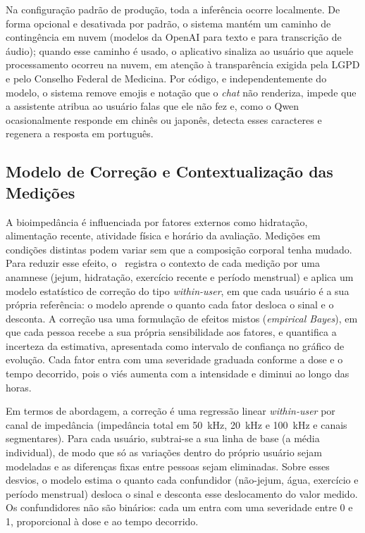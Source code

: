 Na configuração padrão de produção, toda a inferência ocorre localmente. De forma opcional e
desativada por padrão, o sistema mantém um caminho de contingência em nuvem (modelos da
OpenAI para texto e para transcrição de áudio); quando esse caminho é usado, o aplicativo
sinaliza ao usuário que aquele processamento ocorreu na nuvem, em atenção à transparência
exigida pela LGPD e pelo Conselho Federal de Medicina. Por código, e independentemente do
modelo, o sistema remove emojis e notação que o \emph{chat} não renderiza, impede que a
assistente atribua ao usuário falas que ele não fez e, como o Qwen ocasionalmente responde
em chinês ou japonês, detecta esses caracteres e regenera a resposta em português.

\subsection{Modelo de Correção e Contextualização das Medições}
\label{sec:correcao}

A bioimpedância é influenciada por fatores externos como hidratação, alimentação recente,
atividade física e horário da avaliação. Medições em condições distintas podem variar sem
que a composição corporal tenha mudado. Para reduzir esse efeito, o \sintonia\ registra o
contexto de cada medição por uma anamnese (jejum, hidratação, exercício recente e período
menstrual) e aplica um modelo estatístico de correção do tipo \emph{within-user}, em que
cada usuário é a sua própria referência: o modelo aprende o quanto cada fator desloca o
sinal e o desconta. A correção usa uma formulação de efeitos mistos (\emph{empirical
Bayes}), em que cada pessoa recebe a sua própria sensibilidade aos fatores, e quantifica a
incerteza da estimativa, apresentada como intervalo de confiança no gráfico de evolução.
Cada fator entra com uma severidade graduada conforme a dose e o tempo decorrido, pois o
viés aumenta com a intensidade e diminui ao longo das horas.

Em termos de abordagem, a correção é uma regressão linear \emph{within-user} por canal de
impedância (impedância total em 50~kHz, 20~kHz e 100~kHz e canais segmentares). Para cada
usuário, subtrai-se a sua linha de base (a média individual), de modo que só as variações
dentro do próprio usuário sejam modeladas e as diferenças fixas entre pessoas sejam
eliminadas. Sobre esses desvios, o modelo estima o quanto cada confundidor (não-jejum, água,
exercício e período menstrual) desloca o sinal e desconta esse deslocamento do valor medido.
Os confundidores não são binários: cada um entra com uma severidade entre 0 e 1, proporcional
à dose e ao tempo decorrido.

